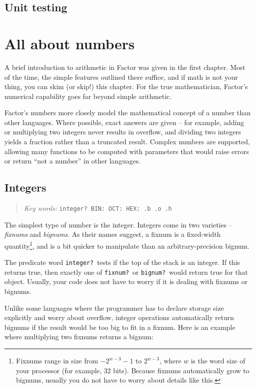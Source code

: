 \documentclass[english]{book}
\newcommand{\chapkeywords}[1]{%
\begin{quote}
\emph{Key words:} \texttt{#1}
\end{quote}
}
\begin{document}
\section{Unit testing}

\chapter{All about numbers}

A brief introduction to arithmetic in Factor was given in the first chapter. Most of the time, the simple features outlined there suffice, and if math is not your thing, you can skim (or skip!) this chapter. For the true mathematician, Factor's numerical capability goes far beyond simple arithmetic.

Factor's numbers more closely model the mathematical concept of a number than other languages. Where possible, exact answers are given -- for example, adding or multiplying two integers never results in overflow, and dividing two integers yields a fraction rather than a truncated result. Complex numbers are supported, allowing many functions to be computed with parameters that would raise errors or return ``not a number'' in other languages.

\section{Integers}

\chapkeywords{integer?~BIN: OCT: HEX: .b .o .h}

The simplest type of number is the integer. Integers come in two varieties -- \emph{fixnums} and \emph{bignums}. As their names suggest, a fixnum is a fixed-width quantity\footnote{Fixnums range in size from $-2^{w-3}-1$ to $2^{w-3}$, where $w$ is the word size of your processor (for example, 32 bits). Because fixnums automatically grow to bignums, usually you do not have to worry about details like this.}, and is a bit quicker to manipulate than an arbitrary-precision bignum.

The predicate word \texttt{integer?}~tests if the top of the stack is an integer. If this returns true, then exactly one of \texttt{fixnum?}~or \texttt{bignum?}~would return true for that object. Usually, your code does not have to worry if it is dealing with fixnums or bignums.

Unlike some languages where the programmer has to declare storage size explicitly and worry about overflow, integer operations automatically return bignums if the result would be too big to fit in a fixnum. Here is an example where multiplying two fixnums returns a bignum:
\end{document}

